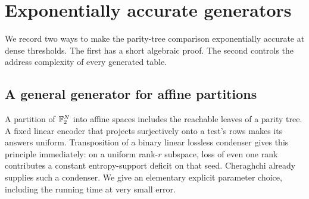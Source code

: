 \section{Exponentially accurate generators}
We record two ways to make the parity-tree comparison exponentially accurate at dense thresholds. The first has a short algebraic proof. The second controls the address complexity of every generated table.

\subsection{A general generator for affine partitions}
A partition of $\mathbb F_2^N$ into affine spaces includes the reachable leaves of a parity tree. A fixed linear encoder that projects surjectively onto a test's rows makes its answers uniform. Transposition of a binary linear lossless condenser gives this principle immediately: on a uniform rank-$r$ subspace, loss of even one rank contributes a constant entropy-support deficit on that seed. Cheraghchi \cite[Corollary 2.23]{cher} already supplies such a condenser. We give an elementary explicit parameter choice, including the running time at very small error.

